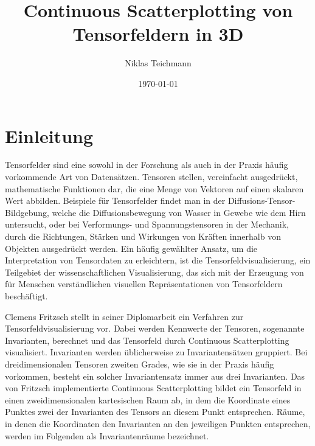 \documentclass[a4paper,fontsize=12pt,toc=bib,parskip=half,ngerman]{scrartcl}
\title{Continuous Scatterplotting von Tensorfeldern in 3D\xspace}
\author{Niklas Teichmann}
\date{\today}
\begin{document}
\maketitle\clearpage
\pagestyle{empty}
\tableofcontents
\clearpage

\pagestyle{scrheadings}


\section{Einleitung}
Tensorfelder sind eine sowohl in der Forschung als auch in der Praxis h\"aufig vorkommende Art von Datens\"atzen. Tensoren stellen, vereinfacht ausgedr\"uckt, mathematische Funktionen dar, die eine Menge von Vektoren auf einen skalaren Wert abbilden. Beispiele f\"ur Tensorfelder findet man in der Diffusions-Tensor-Bildgebung\cite{basser1994mr}, welche die Diffusionsbewegung von Wasser in Gewebe wie dem Hirn untersucht, oder bei Verformungs-\cite[S.~122]{FundamentalsofStructuralMechanics} und Spannungstensoren\cite[S.~154]{FundamentalsofStructuralMechanics} in der Mechanik, durch die Richtungen, St\"arken und Wirkungen von Kr\"aften innerhalb von Objekten ausgedr\"uckt werden. Ein h\"aufig gew\"ahlter Ansatz, um die Interpretation von Tensordaten zu erleichtern, ist die Tensorfeldvisualisierung, ein Teilgebiet der wissenschaftlichen Visualisierung, das sich mit der Erzeugung von f\"ur Menschen verst\"andlichen visuellen Repr\"asentationen von Tensorfeldern besch\"aftigt.

Clemens Fritzsch stellt in seiner Diplomarbeit\cite{fritzsch2016continuousScatterplot} ein Verfahren zur Tensorfeldvisualisierung vor. Dabei werden Kennwerte der Tensoren, sogenannte Invarianten, berechnet und das Tensorfeld durch Continuous Scatterplotting\cite{bachthaler2008continuous} visualisiert. Invarianten werden \"ublicherweise zu Invariantens\"atzen gruppiert. Bei dreidimensionalen Tensoren zweiten Grades, wie sie in der Praxis h\"aufig vorkommen, besteht ein solcher Invariantensatz immer aus drei Invarianten. Das von Fritzsch implementierte Continuous Scatterplotting bildet ein Tensorfeld in einen zweidimensionalen kartesischen Raum ab, in dem die Koordinate eines Punktes zwei der Invarianten des Tensors an diesem Punkt entsprechen. R\"aume, in denen die Koordinaten den Invarianten an den jeweiligen Punkten entsprechen, werden im Folgenden als \glq Invariantenr\"aume\grq{} bezeichnet.
\end{document}
